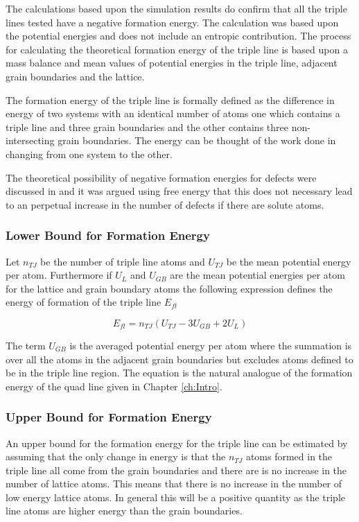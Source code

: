 \documentclass[12pt,a4paper]{book}
\begin{document}
The calculations based upon the simulation results do confirm that all the triple lines tested have a negative formation energy. The calculation was based upon the potential energies and does not include an entropic contribution. The process for calculating the theoretical formation energy of the triple line is based upon a mass balance and mean values of potential energies in the triple line, adjacent grain boundaries and the lattice.

The formation energy of the triple line is formally defined as the difference in energy of two systems with an identical number of atoms one which contains a triple line and three grain boundaries and the other contains three non-intersecting grain boundaries. The energy can be thought of the work done in changing from one system to the other.

The theoretical possibility of negative formation energies for defects were discussed in \cite{KIRCHHEIM20075129} and it was argued using free energy that this does not necessary lead to an perpetual increase in the number of defects if there are solute atoms.  

\subsubsection{Lower Bound for Formation Energy}

Let $n_{TJ}$ be the number of triple line atoms and $U_{TJ}$ be the mean potential energy per atom. Furthermore if $U_{L}$ and $U_{GB}$ are the mean potential energies per atom for the lattice and grain boundary atoms the following expression defines the energy of formation of the triple line $E_{fl}$

\[ E_{fl} = n_{TJ}\left(U_{TJ} -3U_{GB} + 2U_{L} \right) \]

The term $U_{GB}$ is the averaged potential energy per atom where the summation is over all the atoms in the adjacent grain boundaries but excludes atoms defined to be in the triple line region. The equation is the natural analogue of the formation energy of the quad line given in Chapter \ref{ch:Intro}.



    

\subsubsection{Upper Bound for Formation Energy}

An upper bound for the formation energy for the triple line can be estimated by assuming that the only change in energy is that the  $n_{TJ}$ atoms formed in the triple line all come from the grain boundaries and there are is no increase in the number of lattice atoms. This means that there is no increase in the number of low energy lattice atoms. In general this will be a positive quantity as the triple line atoms are higher energy than the grain boundaries. 
\end{document}
